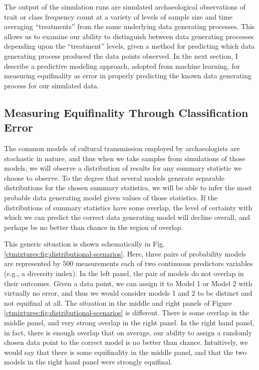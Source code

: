 The output of the simulation runs are simulated archaeological observations of trait or class frequency count at a variety of levels of sample size and time averaging ``treatments'' from the same underlying data generating processes.  This allows us to examine our ability to distinguish between data generating processes depending upon the ``treatment'' levels, given a method for predicting which data generating process produced the data points observed.  In the next section, I describe a predictive modeling approach, adopted from machine learning, for measuring equifinality as error in properly predicting the known data generating process for our simulated data.  

\subsection{Measuring Equifinality Through Classification Error}
\label{sec:equifinality-classification-error}

The common models of cultural transmission employed by archaeologists are stochastic in nature, and thus when we take samples from simulations of those models, we will observe a distribution of results for any summary statistic we choose to observe.   To the degree that several models generate separable distributions for the chosen summary statistics, we will be able to infer the most probable data generating model given values of those statistics.  If the distributions of summary statistics have some overlap, the level of certainty with which we can predict the correct data generating model will decline overall, and perhaps be no better than chance in the region of overlap.  

This generic situation is shown schematically in Fig.
\ref{ctmixtures:fig:distributional-scenarios}. Here, three pairs of probability models
are represented by 500 measurements each of two continuous predictors variables (e.g., a diversity index).
In the left panel, the pair of models do not overlap in their outcomes.
Given a data point, we can assign it to Model 1 or Model 2 with
virtually no error, and thus we would consider models 1 and 2 to be
distinct and not equifinal at all. The situation in the middle and right
panels of Figure \ref{ctmixtures:fig:distributional-scenarios} is different. There is
some overlap in the middle panel, and very strong overlap in the right
panel. In the right hand panel, in fact, there is enough overlap that on
average, our ability to assign a randomly chosen data point to the
correct model is no better than chance. Intuitively, we would say that
there is some equifinality in the middle panel, and that the two models
in the right hand panel were strongly equifinal.

